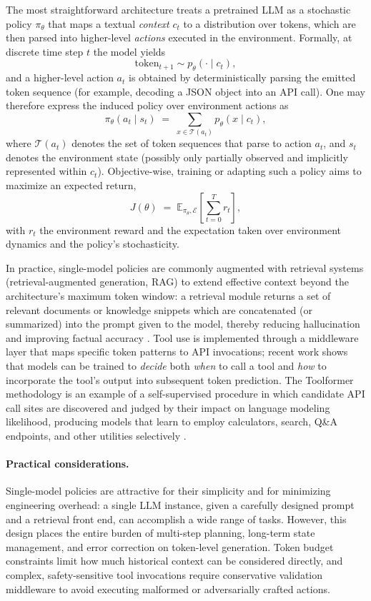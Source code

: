 The most straightforward architecture treats a pretrained LLM as a stochastic policy $\pi_{\theta}$ that maps a textual \emph{context} $c_t$ to a distribution over tokens, which are then parsed into higher-level \emph{actions} executed in the environment.  Formally, at discrete time step $t$ the model yields
\[
\text{token}_{t+1} \sim p_{\theta}(\cdot \mid c_t),
\]
and a higher-level action $a_t$ is obtained by deterministically parsing the emitted token sequence (for example, decoding a JSON object into an API call).  One may therefore express the induced policy over environment actions as
\begin{equation}\label{eq:policy_via_text}
  \pi_{\theta}(a_t \mid s_t) \;=\; \sum_{x \in \mathcal{T}(a_t)} p_{\theta}(x \mid c_t),
\end{equation}
where $\mathcal{T}(a_t)$ denotes the set of token sequences that parse to action $a_t$, and $s_t$ denotes the environment state (possibly only partially observed and implicitly represented within $c_t$).  Objective-wise, training or adapting such a policy aims to maximize an expected return,
\[
J(\theta) \;=\; \mathbb{E}_{\pi_\theta,\mathcal{E}}\!\left[\sum_{t=0}^T r_t\right],
\]
with $r_t$ the environment reward and the expectation taken over environment dynamics and the policy's stochasticity.

In practice, single-model policies are commonly augmented with retrieval systems (retrieval-augmented generation, RAG) to extend effective context beyond the architecture's maximum token window: a retrieval module returns a set of relevant documents or knowledge snippets which are concatenated (or summarized) into the prompt given to the model, thereby reducing hallucination and improving factual accuracy \cite{lewis20}.  Tool use is implemented through a middleware layer that maps specific token patterns to API invocations; recent work shows that models can be trained to \emph{decide} both \emph{when} to call a tool and \emph{how} to incorporate the tool's output into subsequent token prediction.  The Toolformer methodology is an example of a self-supervised procedure in which candidate API call sites are discovered and judged by their impact on language modeling likelihood, producing models that learn to employ calculators, search, Q\&A endpoints, and other utilities selectively \cite{schick23}.

\paragraph{Practical considerations.} Single-model policies are attractive for their simplicity and for minimizing engineering overhead: a single LLM instance, given a carefully designed prompt and a retrieval front end, can accomplish a wide range of tasks.  However, this design places the entire burden of multi-step planning, long-term state management, and error correction on token-level generation.  Token budget constraints limit how much historical context can be considered directly, and complex, safety-sensitive tool invocations require conservative validation middleware to avoid executing malformed or adversarially crafted actions.

